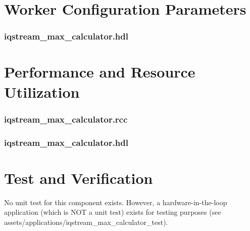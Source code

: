 \documentclass{article}
\def\comp{temp}
\def\comp{iqstream\_max\_calculator}
\def\comp{iqstream\_max\_calculator}
\edef\ecomp{iqstream_max_calculator}
\begin{document}
\begin{landscape}
\section*{Worker Configuration Parameters}
\subsubsection*{\comp.hdl}

\section*{Performance and Resource Utilization}
\subsubsection*{\comp.rcc}
\subsubsection*{\comp.hdl}

\end{landscape}


\section*{Test and Verification}
\begin{flushleft}
No unit test for this component exists. However, a hardware-in-the-loop
application (which is NOT a unit test) exists for testing purposes (see
assets/applications/iqstream\_max\_calculator\_test).
\end{flushleft}
\end{document}
